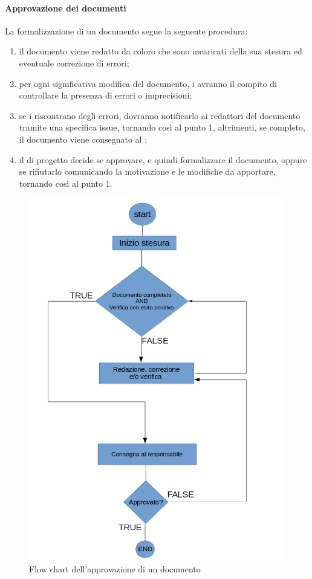  \paragraph{Approvazione dei documenti}
La formalizzazione di un documento segue la seguente procedura:
\begin{enumerate}
	\item il documento viene redatto da coloro che sono incaricati della sua stesura ed eventuale correzione di errori;
	\item per ogni significativa modifica del documento, i \VERP{} avranno il compito di controllare la presenza di errori o imprecisioni;
	\item se i \VERP{} riscontrano degli errori, dovranno notificarlo ai redattori del documento tramite una specifica issue, tornando così al punto 1, altrimenti, se completo, il documento viene consegnato al \RESP{};
	\item il \RESP{} di progetto decide se approvare, e quindi formalizzare il documento, oppure se rifiutarlo comunicando la motivazione e le modifiche da apportare, tornando così al punto 1.
\end{enumerate}
\begin{figure}[h]
\centering
\includegraphics[scale=0.4]{img/flussoapprovazione.png}
\caption{Flow chart dell'approvazione di un documento}\label{sec:Figura2}
\end{figure}
